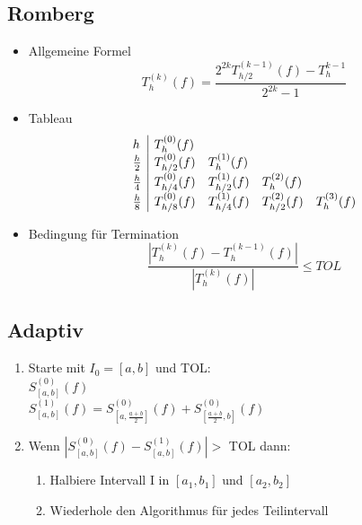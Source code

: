 \subsection{Romberg}
\begin{itemize}
	
	\item Allgemeine Formel \\
	\begin{displaymath}
		T_h^{(k)}(f) = \frac{2^{2k} T_{h/2}^{(k-1)}(f) - T_h^{k-1}}{2^{2k}-1}
	\end{displaymath}
	
	\item Tableau \\
	\begin{displaymath}
		\begin{array}{l | llll}
			h & T_h^{(0)}(f) \\
			\frac{h}{2} & T_{h/2}^{(0)}(f) & T_{h}^{(1)}(f) \\
			\frac{h}{4} & T_{h/4}^{(0)}(f) & T_{h/2}^{(1)}(f) & T_{h}^{(2)}(f)\\
			\frac{h}{8} & T_{h/8}^{(0)}(f) & T_{h/4}^{(1)}(f) & T_{h/2}^{(2)}(f) & T_{h}^{(3)}(f) \\
		\end{array}
	\end{displaymath}
	
	\item Bedingung für Termination \\
	\begin{equation*}
		\frac{|T_{h}^{(k)}(f) - T_{h}^{(k-1)}(f)|}{|T_{h}^{(k)}(f)|} \leq TOL
	\end{equation*}
		
\end{itemize}

\subsection{Adaptiv}
\begin{enumerate}
	
	\item Starte mit $I_0 = [a, b]$ und TOL: \\
	$S_{[a,b]}^{(0)}(f)$ \\
	$S_{[a,b]}^{(1)}(f) = S_{[a,\frac{a+b}{2}]}^{(0)}(f) + S_{[\frac{a+b}{2},b]}^{(0)}(f)$
	
	\item Wenn $|S_{[a,b]}^{(0)}(f) - S_{[a,b]}^{(1)}(f)| >$ TOL dann: \\
	
	\begin{enumerate}
		
		\item Halbiere Intervall I in $[a_1, b_1]$ und $[a_2, b_2]$	
		
		\item Wiederhole den Algorithmus für jedes Teilintervall
		
	\end{enumerate}
\end{enumerate}
